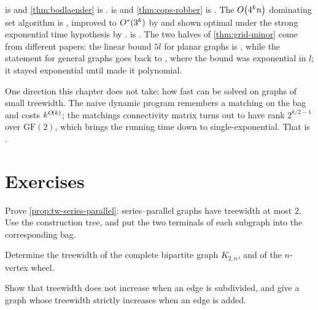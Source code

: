  is \citet{ArnborgCorneilProskurowski1987} and
\cref{thm:bodlaender} is \citet{Bodlaender1996}.
 is \citet{Courcelle1990} and
\cref{thm:cops-robber} is \citet{SeymourThomas1993}. The
$O\!\left(4^k n\right)$ dominating set algorithm is
\citet{AlberBodlaenderFernauKloksNiedermeier2002}, improved to $O^{*}(3^k)$ by
\citet{VanRooijBodlaenderRossmanith2009} and shown optimal under the strong
exponential time hypothesis by \citet{LokshtanovMarxSaurabh2018}.
 is \citet{FominHoie2006}.
The two halves of \cref{thm:grid-minor} come from different papers: the linear
bound $5l$ for planar graphs is \citet{RobertsonSeymourThomas1994}, while the
statement for general graphs goes back to \citet{RobertsonSeymour1986}, where
the bound was exponential in $l$; it stayed exponential until
\citet{ChekuriChuzhoy2016} made it polynomial.

One direction this chapter does not take: how fast 
can be solved on graphs of small treewidth. The naive dynamic program remembers a matching on the bag and costs
$k^{O\!\left(k\right)}$; the matchings connectivity matrix turns out to have rank
$2^{k/2-1}$ over $\mathrm{GF}(2)$, which brings the running time down to
single-exponential. That is \citet{CyganKratschNederlof2018}.

\section{Exercises}
\label{sec:ex-treewidth}

\begin{exercise}\label{ex:tw-series-parallel}
Prove \cref{prop:tw-series-parallel}: series--parallel graphs have treewidth at
most $2$. Use the construction tree, and put the two terminals of each subgraph
into the corresponding bag.
\end{exercise}

\begin{exercise}
Determine the treewidth of the complete bipartite graph $K_{2,n}$, and of the
$n$-vertex wheel.
\end{exercise}

\begin{exercise}
Show that treewidth does not increase when an edge is subdivided, and give a
graph whose treewidth strictly increases when an edge is added.
\end{exercise}

